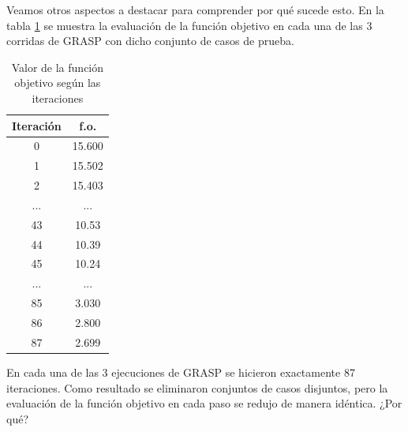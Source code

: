 \documentclass[a4paper,12pt]{book}
\begin{document}


	Veamos otros aspectos a destacar para comprender por qué sucede esto. En la tabla \ref{tab:foGRASP123} se muestra la evaluación de la función objetivo en cada una de las 3 corridas de GRASP con dicho conjunto de casos de prueba.
	
	\begin{table}[h]
		\begin{center}
			\begin{tabular}{| c | c |} \hline
				Iteración & f.o. \\ \hline
				0 & 15.600 \\
				1 & 15.502 \\
				2 & 15.403 \\
				... & ... \\
				43 & 10.53 \\
				44 & 10.39 \\
				45 & 10.24 \\
				... & ... \\
				85 & 3.030 \\
				86 & 2.800 \\
				87 & 2.699 \\ \hline
			\end{tabular}
			\caption{Valor de la función objetivo según las iteraciones}
			\label{tab:foGRASP123}
		\end{center}
	\end{table}
	
		
	En cada una de las 3 ejecuciones de GRASP se hicieron exactamente 87 iteraciones. Como resultado se eliminaron conjuntos de casos disjuntos, pero la evaluación de la función objetivo en cada paso se redujo de manera idéntica. ¿Por qué? \\
	
\end{document}
